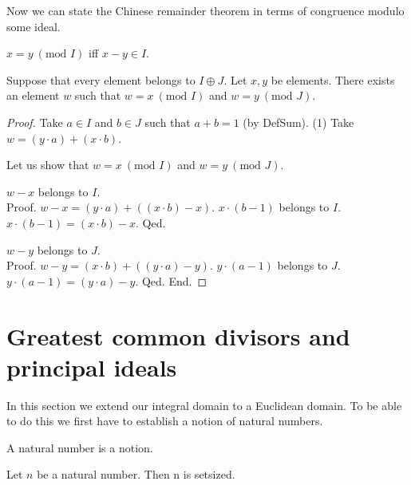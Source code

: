 \documentclass{article}
\renewcommand{\mod}{\text{mod }}
\begin{document}
  Now we can state the Chinese remainder theorem in terms of congruence modulo some ideal.

  \begin{forthel}
    \begin{definition}[DefMod]
      $x = y ~(\mod I)$ iff $x - y \in I$.
    \end{definition}

    \begin{theorem}[ChineseRemainder]
      Suppose that every element belongs to $I \oplus J$. Let $x, y$ be elements. There exists an element $w$ such that $w = x ~(\mod I)$ and $w = y ~(\mod J)$.
    \end{theorem}
    \begin{proof}
      Take $a \in I$ and $b \in J$ such that $a + b = 1$ (by DefSum).
      (1) Take $w = (y \cdot a) + (x \cdot b)$.

      Let us show that $w = x ~(\mod I)$ and $w = y ~(\mod J)$.

        $w - x$ belongs to $I$. \\
        Proof.
          $w - x = (y \cdot a) + ((x \cdot b) - x)$. $x \cdot (b - 1)$ belongs to $I$. $x \cdot (b - 1) = (x \cdot b) - x$.
        Qed.

        $w - y$ belongs to $J$. \\
        Proof.
          $w - y = (x \cdot b) + ((y \cdot a) - y)$. $y \cdot (a - 1)$ belongs to $J$. $y \cdot (a - 1) = (y \cdot a) - y$.
        Qed.
      End.
    \end{proof}
  \end{forthel}


  \section{Greatest common divisors and principal ideals}

  In this section we extend our integral domain to a Euclidean domain. To be able to do this we first have to establish a notion of natural numbers.

  \begin{forthel}

    \begin{signature}[NatSort]
      A natural number is a notion.
    \end{signature}

    \begin{axiom}
      Let $n$ be a natural number. Then n is setsized.
    \end{axiom}
  \end{forthel}
\end{document}
